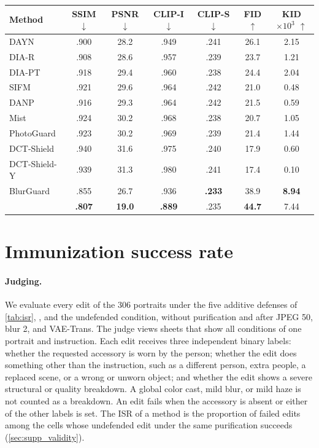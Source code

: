\begin{table}[t]
\begin{minipage}[t]{0.52\textwidth}
  \label{tab:supp_edit_metrics}
  \begin{tabular}{@{}l cccccc@{}}
    \toprule
    Method & SSIM $\downarrow$ & PSNR $\downarrow$ & CLIP-I $\downarrow$ & CLIP-S $\downarrow$ & FID $\uparrow$ & KID$\times10^3$ $\uparrow$ \\
    \midrule
    DAYN & .900 & 28.2 & .949 & .241 & 26.1 & 2.15 \\
    DIA-R & .908 & 28.6 & .957 & .239 & 23.7 & 1.21 \\
    DIA-PT & .918 & 29.4 & .960 & .238 & 24.4 & 2.04 \\
    SIFM & .921 & 29.6 & .964 & .242 & 21.0 & 0.48 \\
    DANP & .916 & 29.3 & .964 & .242 & 21.5 & 0.59 \\
    Mist & .924 & 30.2 & .968 & .238 & 20.7 & 1.05 \\
    PhotoGuard & .923 & 30.2 & .969 & .239 & 21.4 & 1.44 \\
    DCT-Shield & .940 & 31.6 & .975 & .240 & 17.9 & 0.60 \\
    DCT-Shield-Y & .939 & 31.3 & .980 & .241 & 17.4 & 0.10 \\
    BlurGuard & .855 & 26.7 & .936 & \textbf{.233} & 38.9 & \textbf{8.94} \\
    \midrule
    \rowcolor{oursrow}
    \textbf{\capg{}} & \textbf{.807} & \textbf{19.0} & \textbf{.889} & .235 & \textbf{44.7} & 7.44 \\
    \bottomrule
  \end{tabular}
  \end{minipage}
\end{table}




\section{Immunization success rate}
\label{sec:supp_isr}
\paragraph{Judging.} We evaluate every edit of the 306 portraits under the five additive defenses of \cref{tab:isr}, \capg{}, and the undefended condition, without purification and after JPEG 50, blur 2, and VAE-Trans. The judge views sheets that show all conditions of one portrait and instruction. Each edit receives three independent binary labels: whether the requested accessory is worn by the person; whether the edit does something other than the instruction, such as a different person, extra people, a replaced scene, or a wrong or unworn object; and whether the edit shows a severe structural or quality breakdown. A global color cast, mild blur, or mild haze is not counted as a breakdown. An edit fails when the accessory is absent or either of the other labels is set. The ISR of a method is the proportion of failed edits among the cells whose undefended edit under the same purification succeeds (\cref{sec:supp_validity}).

